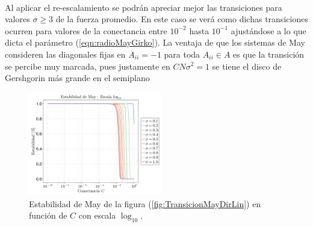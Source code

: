 \\
Al aplicar el re-escalamiento se podrán apreciar mejor las transiciones para valores  $\sigma\geq3$ de la fuerza promedio. En este caso se verá como dichas transiciones ocurren para valores de la conectancia entre $10^{-2}$ hasta $10^{-1}$ ajustándose a lo que dicta el parámetro (\ref{eqn:radioMayGirko}). La ventaja de que los sistemas de May consideren las diagonales fijas en $A_{ii}=-1$ para toda $A_{ii}\in A$ es que la transición se percibe muy marcada, pues justamente en $CN\sigma^2=1$ se tiene el disco de Gershgorin más grande en el semiplano
\begin{figure} \vspace{-30pt} \begin{center}
		\includegraphics[width=0.52\textwidth]{../Imagenes/TransicionMayDirLog} 
	\end{center} 
	\vspace{-20pt} 
	\caption{Estabilidad de May de la figura (\ref{fig:TransicionMayDirLin}) en función de $C$ con escala $\log_{10}$.} 
	\vspace{-10pt}
	\label{fig:TransicionMayDirLog}
\end{figure} 


